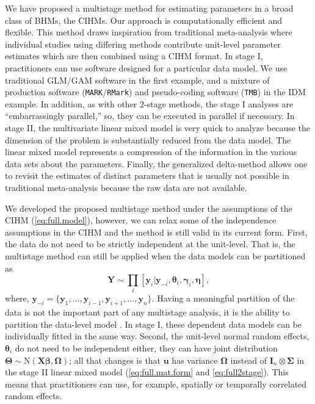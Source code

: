 \documentclass[12pt]{article}
\newcommand{\by}{\mathbf{y}}
\newcommand{\bt}{\boldsymbol{\theta}}
\newcommand{\bb}{\boldsymbol{\beta}}
\newcommand{\bn}{\boldsymbol{\eta}}
\newcommand{\bT}{\boldsymbol{\Theta}}
\newcommand{\bg}{\boldsymbol{\gamma}}
\newcommand{\bSig}{\boldsymbol{\Sigma}}
\newcommand{\bO}{\boldsymbol{\Omega}}
\newcommand{\bX}{\mathbf{X}}
\newcommand{\bu}{\mathbf{u}}
\newcommand{\tN}{\text{N}}
\newcommand{\bY}{\mathbf{Y}}
\newcommand{\bI}{\mathbf{I}}
\begin{document}
We have proposed a multistage method for estimating parameters in a broad class of BHMs, the CIHMs. Our approach is computationally efficient and flexible. This method draws inspiration from traditional meta-analysis where individual studies using differing methods contribute unit-level parameter estimates which are then combined using a CIHM format. In stage I, practitioners can use software designed for a particular data model. We use traditional GLM/GAM software in the first example, and a mixture of production software ({\tt MARK}/{\tt RMark}) and pseudo-coding software ({\tt TMB}) in the IDM example. In addition, as with other 2-stage methods, the stage I analyses are ``embarrassingly parallel,'' so, they can be executed in parallel if necessary. In stage II, the multivariate linear mixed model is very quick to analyze because the dimension of the problem is substantially reduced from the data model. The linear mixed model represents a compression of the information in the various data sets about the parameters. Finally, the generalized delta-method allows one to revisit the estimates of distinct parameters that is usually not possible in traditional meta-analysis because the raw data are not available.  

We developed the proposed multistage method under the assumptions of the CIHM (\ref{eq:full.model}), however, we  can relax some of the independence assumptions in the CIHM and the method is still valid in its current form. First, the data do not need to be strictly independent at the unit-level. That is, the multistage method can still be applied when the data models can be partitioned as
\[
\bY \sim \prod_i[\by_i|\by_{-i}, \bt_i, \bg_i, \bn],
\]
where, $\by_{-i} = \{\by_1,\dots,\by_{i-1},\by_{i+1},\dots,\by_n\}$. Having a meaningful partition of the data is not the important part of any multistage analysis, it is the ability to partition the data-level model \citep{hooten2018prior}. In stage I, these dependent data models can be individually fitted in the same way. Second, the unit-level normal random effects, $\bt_i$ do not need to be independent either, they can have joint distribution $\bT  \sim \tN(\bX\bb, \bO)$; all that changes is that $\bu$ has variance $\bO$ instead of $\bI_n \otimes \bSig$ in the stage II linear mixed model (\ref{eq:full.mat.form} and \ref{eq:full2stage}). This means that practitioners can use, for example, spatially or temporally correlated random effects. 
\end{document}
